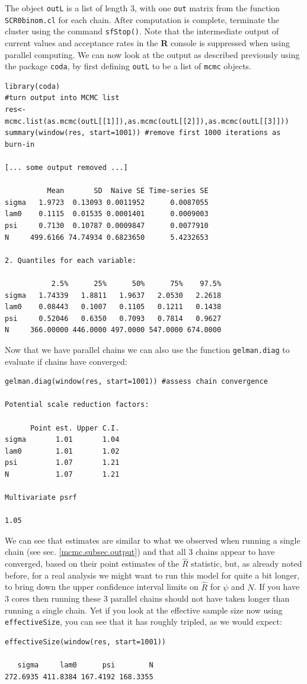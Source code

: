 The object {\tt outL} is a list of length 3, with one {\tt out} matrix from the function {\tt SCR0binom.cl} for each chain. After computation is complete, terminate the cluster using the command {\tt sfStop()}. Note that the intermediate output of current values and acceptance rates in the {\bf R} console is suppressed when using parallel computing. We can now look at the output as described previously using the package {\tt coda}, by first defining {\tt outL} to be a list of {\tt mcmc} objects.
{\small
\begin{verbatim}
library(coda)
#turn output into MCMC list
res<-mcmc.list(as.mcmc(outL[[1]]),as.mcmc(outL[[2]]),as.mcmc(outL[[3]]))
summary(window(res, start=1001)) #remove first 1000 iterations as burn-in

[... some output removed ...]

          Mean       SD  Naive SE Time-series SE
sigma   1.9723  0.13093 0.0011952      0.0087055
lam0    0.1115  0.01535 0.0001401      0.0009003
psi     0.7130  0.10787 0.0009847      0.0077910
N     499.6166 74.74934 0.6823650      5.4232653

2. Quantiles for each variable:

           2.5%      25%      50%      75%    97.5%
sigma   1.74339   1.8811   1.9637   2.0530   2.2618
lam0    0.08443   0.1007   0.1105   0.1211   0.1438
psi     0.52046   0.6350   0.7093   0.7814   0.9627
N     366.00000 446.0000 497.0000 547.0000 674.0000
\end{verbatim}
}
Now that we have parallel chains we can also use the function {\tt gelman.diag} to evaluate if chains have converged:
{\small
\begin{verbatim}
gelman.diag(window(res, start=1001)) #assess chain convergence

Potential scale reduction factors:

      Point est. Upper C.I.
sigma       1.01       1.04
lam0        1.01       1.02
psi         1.07       1.21
N           1.07       1.21

Multivariate psrf

1.05
\end{verbatim}
}
We can see that estimates are similar to what we observed when running a single chain (see sec. \ref{mcmc.subsec.output}) and that all 3 chains appear to have converged, based on their point estimates of the $\hat{R}$ statistic, but, as already noted before, for a real analysis we might want to run this model for quite a bit longer, to bring down the upper confidence interval limits on $\hat{R}$ for $\psi$ and $N$. If you have 3 cores then running these 3 parallel chains should not have taken longer than running a single chain. Yet if you look at the effective sample size now using {\tt effectiveSize}, you can see that it has roughly tripled, as we would expect:
{\small
\begin{verbatim}
effectiveSize(window(res, start=1001))

   sigma     lam0      psi        N
272.6935 411.8384 167.4192 168.3355
\end{verbatim}
}

